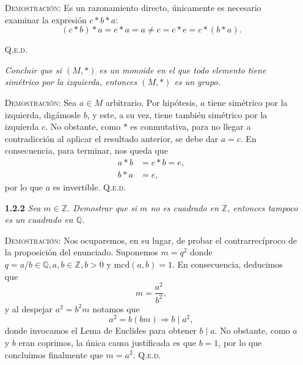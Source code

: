 \documentclass{article}
\newcommand{\mcd}{\text{mcd}}
\begin{document}
\begin{enumerate}
    \vspace{7px}

    \textsc{Demostración}: Es un razonamiento directo, únicamente es necesario examinar la expresión $c * b * a$: \[(c * b) * a = e * a = a \neq c = c * e = c * (b * a).\]

    \hfill{\textsc{Q.e.d.}}

    \vspace{7px}

    \newpage

    \textit{Concluir que si $(M, *)$ es un monoide en el que todo elemento tiene simétrico por la izquierda, entonces $(M, *)$ es un grupo.}

    \vspace{7px}

    \textsc{Demostración}: Sea $a \in M$ arbitrario. Por hipótesis, $a$ tiene simétrico por la izquierda, digámosle $b$, y este, a su vez, tiene también simétrico por la izquierda $c$. No obstante, como $*$ es conmutativa, para no llegar a contradicción al aplicar el resultado anterior, se debe dar $a = c$. En consecuencia, para terminar, nos queda que
    \begin{equation*}
    \begin{split}
        a * b & = c * b = e, \\
        b * a & = e,
    \end{split}
    \end{equation*}
    por lo que $a$ es invertible. \hfill{\textsc{Q.e.d.}}

    \vspace{12px}

    \item[\textbf{1.2.2}] \textit{Sea $m \in \mathbb{Z}$. Demostrar que si $m$ no es cuadrado en $\mathbb{Z}$, entonces tampoco es un cuadrado en $\mathbb{Q}$.}

    \vspace{7px}

    \textsc{Demostración}: Nos ocuparemos, en su lugar, de probar el contrarrecíproco de la proposición del enunciado. Suponemos $m = q^2$ donde $q = a / b \in \mathbb{Q}, a, b \in \mathbb{Z}, b > 0$ y $\mcd(a, b) = 1$. En consecuencia, deducimos que \[m = \frac{a^2}{b^2},\] y al despejar $a^2 = b^2m$ notamos que \[a^2 = b(bm) \Longrightarrow b \mid a^2,\] donde invocamos el Lema de Euclides para obtener $b \mid a$. No obstante, como $a$ y $b$ eran coprimos, la única causa justificada es que $b = 1$, por lo que concluimos finalmente que $m = a^2$. \hfill{\textsc{Q.e.d.}}


\end{enumerate}
\end{document}
